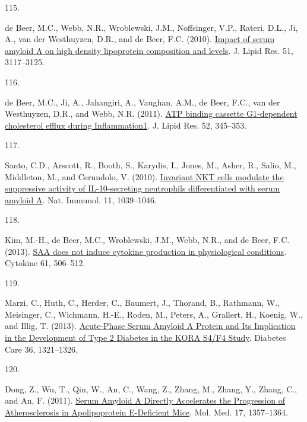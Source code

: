 \documentclass[
]{article}
\newlength{\cslhangindent}
\newlength{\csllabelwidth}
\newlength{\cslentryspacingunit} %
\newenvironment{CSLReferences}[2] %
 {%
  \setlength{\parindent}{0pt}
  \ifodd #1
  \let\oldpar\par
  \def\par{\hangindent=\cslhangindent\oldpar}
  \fi
  \setlength{\parskip}{#2\cslentryspacingunit}
 }%
 {}
\newcommand{\CSLLeftMargin}[1]{\parbox[t]{\csllabelwidth}{#1}}
\newcommand{\CSLRightInline}[1]{\parbox[t]{\linewidth - \csllabelwidth}{#1}\break}
\begin{document}
\begin{CSLReferences}{0}{0}
\leavevmode{}%
\CSLLeftMargin{115. }
\CSLRightInline{de Beer, M.C., Webb, N.R., Wroblewski, J.M., Noffsinger, V.P., Rateri, D.L., Ji, A., van der Westhuyzen, D.R., and de Beer, F.C. (2010). \href{https://doi.org/10.1194/jlr.M005413}{Impact of serum amyloid {A} on high density lipoprotein composition and levels}. J. Lipid Res. 51, 3117--3125.}

\leavevmode{}%
\CSLLeftMargin{116. }
\CSLRightInline{de Beer, M.C., Ji, A., Jahangiri, A., Vaughan, A.M., de Beer, F.C., van der Westhuyzen, D.R., and Webb, N.R. (2011). \href{https://doi.org/10.1194/jlr.M012328}{{ATP} binding cassette {G1-dependent} cholesterol efflux during Inflammation1}. J. Lipid Res. 52, 345--353.}

\leavevmode{}%
\CSLLeftMargin{117. }
\CSLRightInline{Santo, C.D., Arscott, R., Booth, S., Karydis, I., Jones, M., Asher, R., Salio, M., Middleton, M., and Cerundolo, V. (2010). \href{https://doi.org/10.1038/ni.1942}{Invariant {NKT} cells modulate the suppressive activity of {IL-10-secreting} neutrophils differentiated with serum amyloid {A}}. Nat. Immunol. 11, 1039--1046.}

\leavevmode{}%
\CSLLeftMargin{118. }
\CSLRightInline{Kim, M.-H., de Beer, M.C., Wroblewski, J.M., Webb, N.R., and de Beer, F.C. (2013). \href{https://doi.org/10.1016/j.cyto.2012.10.019}{{SAA} does not induce cytokine production in physiological conditions}. Cytokine 61, 506--512.}

\leavevmode{}%
\CSLLeftMargin{119. }
\CSLRightInline{Marzi, C., Huth, C., Herder, C., Baumert, J., Thorand, B., Rathmann, W., Meisinger, C., Wichmann, H.-E., Roden, M., Peters, A., Grallert, H., Koenig, W., and Illig, T. (2013). \href{https://doi.org/10.2337/dc12-1514}{Acute-{Phase Serum Amyloid A Protein} and {Its Implication} in the {Development} of {Type} 2 {Diabetes} in the {KORA S4}/{F4 Study}}. Diabetes Care 36, 1321--1326.}

\leavevmode{}%
\CSLLeftMargin{120. }
\CSLRightInline{Dong, Z., Wu, T., Qin, W., An, C., Wang, Z., Zhang, M., Zhang, Y., Zhang, C., and An, F. (2011). \href{https://doi.org/10.2119/molmed.2011.00186}{Serum {Amyloid A Directly Accelerates} the {Progression} of {Atherosclerosis} in {Apolipoprotein E-Deficient Mice}}. Mol. Med. 17, 1357--1364.}


\end{CSLReferences}
\end{document}
